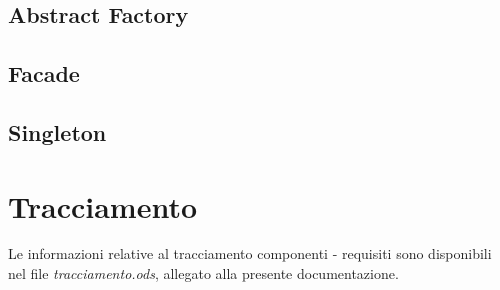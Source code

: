 \documentclass[10pt,a4paper,headinclude,footinclude,hidelinks]{scrreprt} %
\begin{document}
	\section{Abstract Factory}
	\label{ch:stage:design:pattern:factory}

	\section{Facade}
	\label{ch:stage:design:pattern:facade}

	\section{Singleton}
	\label{ch:stage:design:pattern:singleton}

	\chapter{Tracciamento}
	\label{ch:stage:design:tracciamento}
	Le informazioni relative al tracciamento componenti - requisiti sono disponibili nel file \textit{tracciamento.ods}, allegato alla presente documentazione.
\end{document}
